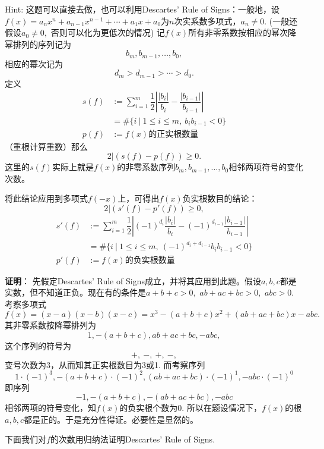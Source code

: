 \vspace{0.5em}

Hint: 这题可以直接去做，也可以利用Descartes' Rule of Signs：一般地，设$f(x) = a_n x^n + a_{n-1} x^{n-1} + \cdots + a_1 x + a_0$为$n$次实系数多项式，$a_n \neq 0.$ (一般还假设$a_0 \neq 0,$ 否则可以化为更低次的情况) 记$f(x)$所有非零系数按相应的幂次降幂排列的序列记为
$$b_m, b_{m-1}, \ldots, b_0,$$
相应的幂次记为
$$d_m > d_{m-1} > \cdots > d_0.$$
定义
\begin{align*}
s(f) & := \sum\limits_{i=1}^{m} \dfrac{1}{2} \left\lvert \dfrac{|b_{i}|}{b_{i}} - \dfrac{|b_{i-1}|}{b_{i-1}} \right\rvert \\
& = \# \{ i ~|~ 1 \leqslant i \leqslant m, ~ b_{i}b_{i-1} < 0 \} \\
p(f) & := \text{$f(x)$的正实根数量}
\end{align*}
（重根计算重数）那么
$$2 | (s(f) - p(f)) \geqslant 0.$$
这里的$s(f)$实际上就是$f(x)$的非零系数序列$b_m, b_{m-1}, \ldots, b_0$相邻两项符号的变化次数。

将此结论应用到多项式$f(-x)$上，可得出$f(x)$负实根数目的结论：
$$2 | (s'(f) - p'(f)) \geqslant 0,$$
\begin{align*}
s'(f) & := \sum\limits_{i=1}^{m} \dfrac{1}{2} \left\lvert (-1)^{d_{i}}\dfrac{|b_{i}|}{b_{i}} - (-1)^{d_{i-1}}\dfrac{|b_{i-1}|}{b_{i-1}} \right\rvert \\
& = \# \{ i ~|~ 1 \leqslant i \leqslant m, ~ (-1)^{d_i+d_{i-1}}b_{i}b_{i-1} < 0 \} \\
p'(f) & := \text{$f(x)$的负实根数量}
\end{align*}

\ifIncludeAnswer

\newpageorvspace

{\bf 证明}： 先假定Descartes' Rule of Signs成立，并将其应用到此题。假设$a, b, c$都是实数，但不知道正负。现在有的条件是$a + b + c > 0,$ $ab + ac + bc > 0,$ $abc > 0.$ 考察多项式
$$f(x) = (x-a)(x-b)(x-c) = x^3 - (a+b+c)x^2 + (ab+ac+bc)x -abc.$$
其非零系数按降幂排列为
$$1, - (a+b+c), ab+ac+bc, -abc,$$
这个序列的符号为
$$+, ~ -, ~ +, ~-,$$
变号次数为3，从而知其正实根数目为3或1. 而考察序列
$$1\cdot(-1)^3, - (a+b+c)\cdot(-1)^2, (ab+ac+bc)\cdot(-1)^1, -abc\cdot(-1)^0$$
即序列
$$-1, - (a+b+c), -(ab+ac+bc), -abc$$
相邻两项的符号变化，知$f(x)$的负实根个数为0. 所以在题设情况下，$f(x)$的根$a, b, c$都是正的。于是充分性得证。必要性是显然的。

\vspace{0.5em}

下面我们对$f$的次数用归纳法证明Descartes' Rule of Signs.

